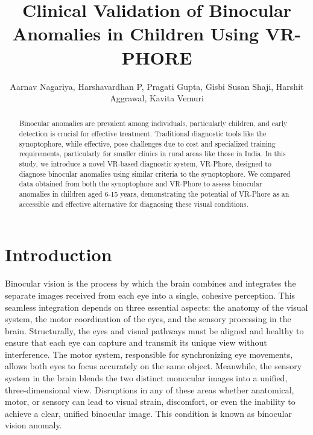 \documentclass{article}
\title{\LARGE \bf
Clinical Validation of Binocular Anomalies in Children Using VR-PHORE
}
\author{Aarnav Nagariya, Harshavardhan P, Pragati Gupta, Gisbi Susan Shaji, Harshit Aggrawal, Kavita Vemuri%
}
\begin{document}
\maketitle
\thispagestyle{empty}
\pagestyle{empty}


\begin{abstract}

Binocular anomalies are prevalent among individuals, particularly children, and early detection is crucial for effective treatment. Traditional diagnostic tools like the synoptophore, while effective, pose challenges due to cost and specialized training requirements, particularly for smaller clinics in rural areas like those in India. In this study, we introduce a novel VR-based diagnostic system, VR-Phore, designed to diagnose binocular anomalies using similar criteria to the synoptophore. We compared data obtained from both the synoptophore and VR-Phore to assess binocular anomalies in children aged 6-15 years, demonstrating the potential of VR-Phore as an accessible and effective alternative for diagnosing these visual conditions.

\end{abstract}


\section{Introduction}

Binocular vision is the process by which the brain combines and integrates the separate images received from each eye into a single, cohesive perception. This seamless integration depends on three essential aspects: the anatomy of the visual system, the motor coordination of the eyes, and the sensory processing in the brain. Structurally, the eyes and visual pathways must be aligned and healthy to ensure that each eye can capture and transmit its unique view without interference. The motor system, responsible for synchronizing eye movements, allows both eyes to focus accurately on the same object. Meanwhile, the sensory system in the brain blends the two distinct monocular images into a unified, three-dimensional view. Disruptions in any of these areas whether anatomical, motor, or sensory can lead to visual strain, discomfort, or even the inability to achieve a clear, unified binocular image. This condition is known as binocular vision anomaly. \cite{Pickwell's Binocular Vision Anomalies}
\end{document}
